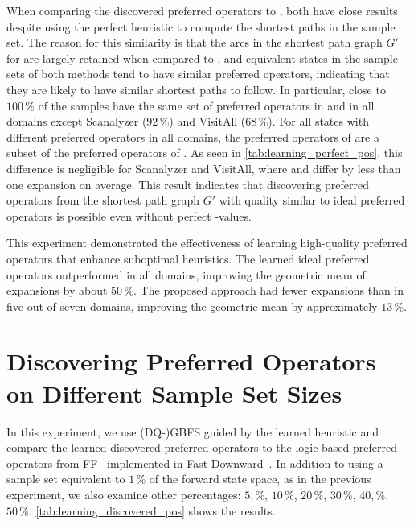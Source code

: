 \documentclass[ppgc,diss,english]{iiufrgs}
\begin{document}

When comparing the discovered preferred operators \pogstar to \pog, both have close results despite \pogstar using the perfect heuristic \hstar to compute the shortest paths in the sample set. The reason for this similarity is that the arcs in the shortest path graph $G'$ for \pog are largely retained when compared to \pogstar, and equivalent states in the sample sets of both methods tend to have similar preferred operators, indicating that they are likely to have similar shortest paths to follow. In particular, close to $100\,\%$ of the samples have the same set of preferred operators in \pogstar and \pog in all domains except Scanalyzer ($92\,\%$) and VisitAll ($68\,\%$). For all states with different preferred operators in all domains, the preferred operators of \pog are a subset of the preferred operators of \pogstar. As seen in \cref{tab:learning_perfect_pos}, this difference is negligible for Scanalyzer and VisitAll, where \pogstar and \pog differ by less than one expansion on average. This result indicates that discovering preferred operators from the shortest path graph $G'$ with quality similar to ideal preferred operators is possible even without perfect \hstar-values.

This experiment demonstrated the effectiveness of learning high-quality preferred operators that enhance suboptimal heuristics. The learned ideal preferred operators \postar outperformed \hnn in all domains, improving the geometric mean of expansions by about $50\,\%$. The proposed approach \pog had fewer expansions than \hnn in five out of seven domains, improving the geometric mean by approximately $13\,\%$.


\section{Discovering Preferred Operators on Different Sample Set Sizes}
\label{sec:exp-performance-po}
In this experiment, we use (DQ-)GBFS guided by the learned heuristic \hnn and compare the learned discovered preferred operators \pog to the logic-based preferred operators \poff from FF~\cite{Hoffmann.Nebel/2001} implemented in Fast Downward~\cite{Helmert/2006}. In addition to using a sample set equivalent to $1\,\%$ of the forward state space, as in the previous experiment, we also examine other percentages: $5,\%$, $10\,\%$, $20\,\%$, $30\,\%$, $40,\%$, $50\,\%$. \cref{tab:learning_discovered_pos} shows the results.
\end{document}
